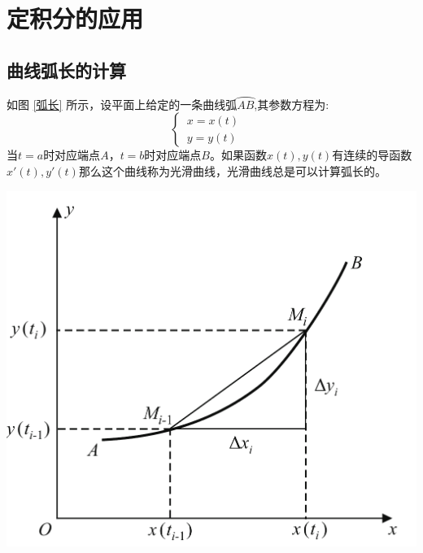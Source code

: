 \noindent
\begin{minipage}{0.5\linewidth}
\section{定积分的应用}
	\subsection{曲线弧长的计算}
\hspace*{2em} 如图 \ref{弧长} 所示，设平面上给定的一条曲线弧$\wideparen{AB}$,其参数方程为:
\begin{equation}
	\begin{cases}
		\, x=x(t)\\
		 \, y=y(t)&
	\end{cases}
\end{equation}
\hspace*{2em} 当$t=a$时对应端点$A$，$t=b$时对应端点$B$。如果函数$x(t),y(t)$有连续的导函数$x'(t),y'(t)$那么这个曲线称为光滑曲线，光滑曲线总是可以计算弧长的。
\end{minipage}
\begin{minipage}{0.5\linewidth}
	\centering
	\includegraphics[width = 0.8\linewidth]{pic/C-4/弧长}
	\vspace*{-1em}
	\label{弧长}
\end{minipage}

